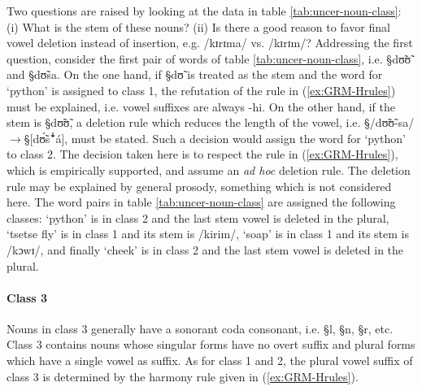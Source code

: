  Two questions are raised by looking at the data in table
\ref{tab:uncer-noun-class}: (i) What is the stem of these nouns?  (ii) Is
there a good reason to favor final vowel deletion instead of insertion, e.g.
 /kɪrɪma/ vs. /kɪrɪm/?
Addressing  the first question, consider the first pair of words of table
\ref{tab:uncer-noun-class}, i.e. {\S dʊ̃ʊ̃}  and {\S dʊ̃sa}. On the one hand, if
 {\S dʊ̃} is treated as   the stem and  the word for `python' is assigned to
class
1,   the refutation of the rule in   (\ref{ex:GRM-Hrules}) must be explained,
i.e.
vowel suffixes are always {\sc -hi}.  On the other hand, if  the stem
is  {\S dʊ̃ʊ̃},  a deletion rule which reduces the length of the 
vowel, i.e. {\S /dʊ̃ʊ̃-sa/}  $\rightarrow${\S [dʊ̃́sꜜá]},  must be stated.
Such a decision  would
assign
the word for `python' to class 2.  The decision taken here is to respect the
rule in
(\ref{ex:GRM-Hrules}), which is empirically supported, and assume an {\it ad
hoc} deletion rule. The deletion rule may be explained by general prosody,
something which is not considered here. The word pairs in table
\ref{tab:uncer-noun-class} are assigned the following classes: `python' is in
class 2 and the last stem vowel is deleted in the plural, `tsetse fly' is in
class 1 and its stem is /kirim/, `soap' is in  class 1 and its stem is /kɔwɪ/,
and finally  `cheek' is in class 2 and the last stem vowel is
deleted in the plural.



 \paragraph{Class 3}
\label{sec:class3}

Nouns in class 3 generally have a sonorant coda consonant, i.e. {\S l}, {\S n}, 
{\S r}, etc. Class 3 contains nouns whose singular forms have no overt
suffix and plural forms  which have a single vowel as suffix. As for class 1 and
2, the
plural vowel suffix of class 3 is determined by the harmony rule given in
(\ref{ex:GRM-Hrules}).



